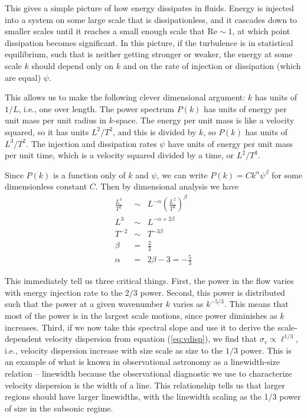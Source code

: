 This gives a simple picture of how energy dissipates in fluids. Energy is injected into a system on some large scale that is dissipationless, and it cascades down to smaller scales until it reaches a small enough scale that $\mbox{Re}\sim 1$, at which point dissipation becomes significant. In this picture, if the turbulence is in statistical equilibrium, such that is neither getting stronger or weaker, the energy at some scale $k$ should depend only on $k$ and on the rate of injection or dissipation (which are equal) $\psi$.

This allows us to make the following clever dimensional argument: $k$ has units of $1/L$, i.e., one over length. The power spectrum $P(k)$ has units of energy per unit mass per unit radius in $k$-space. The energy per unit mass is like a velocity squared, so it has units $L^2/T^2$, and this is divided by $k$, so $P(k)$ has units of $L^3/T^2$. The injection and dissipation rates $\psi$ have units of energy per unit mass per unit time, which is a velocity squared divided by a time, or $L^2/T^3$.

Since $P(k)$ is a function only of $k$ and $\psi$, we can write $P(k) = C k^\alpha \psi^\beta$ for some dimensionless constant $C$. Then by dimensional analysis we have
\begin{eqnarray}
\frac{L^3}{T^2} & \sim & L^{-\alpha} \left(\frac{L^2}{T^3}\right)^\beta \\
L^3 & \sim & L^{-\alpha+2\beta} \\
T^{-2} & \sim & T^{-3\beta}\\
\beta & = & \frac{2}{3} \\
\alpha & = & 2\beta - 3 = -\frac{5}{3}
\end{eqnarray}

This immediately tell us three critical things. First, the power in the flow varies with energy injection rate to the $2/3$ power. Second, this power is distributed such that the power at a given wavenumber $k$ varies as $k^{-5/3}$. This means that most of the power is in the largest scale motions, since power diminishes as $k$ increases. Third, if we now take this spectral slope and use it to derive the scale-dependent velocity dispersion from equation (\ref{eq:vdisp}), we find that $\sigma_v \propto \ell^{1/3}$, i.e., velocity dispersion increase with size scale as size to the $1/3$ power. This is an example of what is known in observational astronomy as a linewidth-size relation -- linewidth because the observational diagnostic we use to characterize velocity dispersion is the width of a line. This relationship tells us that larger regions should have larger linewidths, with the linewidth scaling as the 1/3 power of size in the subsonic regime.

